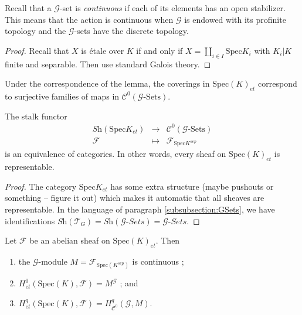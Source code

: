 Recall that a $\mathcal{G}$-set is \emph{continuous} if each of its elements 
has an open stabilizer. This means that the action is continuous when 
$\mathcal{G}$ is endowed with its profinite topology and the $\mathcal{G}$-sets 
have the discrete topology.

\begin{proof}
Recall that $X$ is \'etale over $K$ if and only if  $X=\coprod_{i\in I} 
\text{Spec} K_i$ with $K_i | K$ finite and separable. Then use standard Galois 
theory.
\end{proof}

\begin{remark}
Under the correspondence of the lemma, the coverings in $\text{Spec}(K)_{et}$ 
correspond to surjective families of maps in 
$\mathcal{C}^0(\mathcal{G}\text{-Sets})$. 
\end{remark}

\begin{lemma} \label{lem:EqOfCatContGSets}
The stalk functor
$$
\begin{array}{ccl}
\textit{Sh}(\text{Spec} K_{et}) & \longrightarrow & 
\mathcal{C}^0(\mathcal{G}\text{-Sets}) \\
\mathcal{F} & \longmapsto & \mathcal{F}_{\text{Spec} K^{sep}}
\end{array}
$$
is an equivalence of categories. In other words, every sheaf on 
$\text{Spec}(K)_{et}$ is representable.
\end{lemma}

\begin{proof}
The category $\text{Spec} K_{et}$ has some extra structure (maybe pushouts or 
something -- figure it out) which makes it automatic that all sheaves are 
representable. In the language of paragraph \ref{subsubsection:GSets}, we have 
identifications $\textit{Sh}(\mathcal{T}_G) = 
\textit{Sh}(\mathcal{G}\textit{-Sets}) = \mathcal{G}\textit{-Sets}$.
\end{proof}

\begin{lemma}
Let $\mathcal{F}$ be an abelian sheaf on $\text{Spec}(K)_{et}$. Then
\begin{enumerate}
\item the $\mathcal{G}$-module $M = \mathcal{F}_{\text{Spec}(K^{sep})}$ is 
continuous ;
\item $H_{et}^0(\text{Spec}(K), \mathcal{F})=M^{\mathcal{G}}$ ; and
\item $H_{et}^q(\text{Spec}(K), \mathcal{F}) = H_{\mathcal{C}^0}^q(\mathcal{G}, 
M)$.
\end{enumerate}
\end{lemma}

